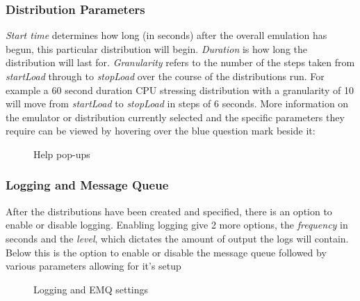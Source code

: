 \documentclass[letterpaper,10pt,english]{sphinxhowto}
\begin{document}
\subsubsection{Distribution Parameters}
\label{COCOMA/07_webUI:distribution-parameters}
\emph{Start time} determines how long (in seconds) after the overall emulation has begun, this particular distribution will begin. \emph{Duration} is how long the distribution will last for. \emph{Granularity} refers to the number of the steps taken from \emph{startLoad} through to \emph{stopLoad} over the course of the distributions run. For example a 60 second duration CPU stressing distribution with a granularity of 10 will move from \emph{startLoad} to \emph{stopLoad} in steps of 6 seconds. More information on the emulator or distribution currently selected and the specific parameters they require can be viewed by hovering over the blue question mark beside it:
\begin{figure}[htbp]
\centering
\capstart

\caption{Help pop-ups}\end{figure}


\subsubsection{Logging and Message Queue}
\label{COCOMA/07_webUI:logging-and-message-queue}
After the distributions have been created and specified, there is an option to enable or disable logging. Enabling logging give 2 more options, the \emph{frequency} in seconds and the \emph{level}, which dictates the amount of output the logs will contain. Below this is the option to enable or disable the message queue followed by various parameters allowing for it's setup
\begin{figure}[htbp]
\centering
\capstart

\caption{Logging and EMQ settings}\end{figure}
\end{document}
